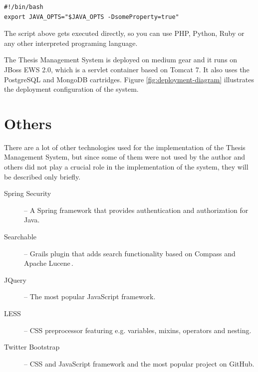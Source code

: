 \begin{verbatim}
#!/bin/bash
export JAVA_OPTS="$JAVA_OPTS -DsomeProperty=true"
\end{verbatim}

The script above gets executed directly, so you can use PHP, Python, Ruby or any other interpreted programing language.

The Thesis Management System is deployed on medium gear and it runs on JBoss EWS 2.0, which is a servlet container based on Tomcat 7. It also uses the PostgreSQL and MongoDB cartridges. Figure \ref{fig:deployment-diagram} illustrates the deployment configuration of the system.

\section{Others}

There are a lot of other technologies used for the implementation of the Thesis Management System, but since some of them were not used by the author and others did not play a crucial role in the implementation of the system, they will be described only briefly.

\begin{description}
    \item[Spring Security] -- A Spring framework that provides authentication and authorization for Java.
    \item[Searchable] -- Grails plugin that adds search functionality based on Compass and Apache Lucene\,\cite{searchable-documentation}.
    \item[JQuery] -- The most popular JavaScript framework.
    \item[LESS] -- CSS preprocessor featuring e.g. variables, mixins, operators and nesting.
    \item[Twitter Bootstrap] -- CSS and JavaScript framework and the most popular project on GitHub.
\end{description}

